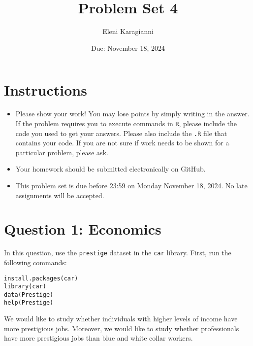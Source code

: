 \documentclass[12pt,letterpaper]{article}
\title{Problem Set 4}
\date{Due: November 18, 2024}
\author{Eleni Karagianni}
\begin{document}
	\maketitle
	\section*{Instructions}
	\begin{itemize}
		\item Please show your work! You may lose points by simply writing in the answer. If the problem requires you to execute commands in \texttt{R}, please include the code you used to get your answers. Please also include the \texttt{.R} file that contains your code. If you are not sure if work needs to be shown for a particular problem, please ask.
		\item Your homework should be submitted electronically on GitHub.
		\item This problem set is due before 23:59 on Monday November 18, 2024. No late assignments will be accepted.
	\end{itemize}



	\vspace{.5cm}
\section*{Question 1: Economics}
\vspace{.25cm}
\noindent 	
In this question, use the \texttt{prestige} dataset in the \texttt{car} library. First, run the following commands:

\begin{verbatim}
install.packages(car)
library(car)
data(Prestige)
help(Prestige)
\end{verbatim} 


\noindent We would like to study whether individuals with higher levels of income have more prestigious jobs. Moreover, we would like to study whether professionals have more prestigious jobs than blue and white collar workers.
\end{document}

